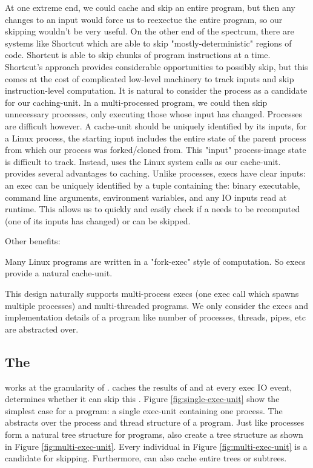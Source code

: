 At one extreme end, we could cache and skip an entire program, but then any changes to an input would force us to reexectue the entire program, so our skipping wouldn't be very useful. On the other end of the spectrum, there are systems like Shortcut \cite{shortcut} which are able to skip "mostly-deterministic" regions of code. Shortcut is able to skip chunks of program instructions at a time. Shortcut's approach provides considerable opportunities to possibly skip, but this comes at the cost of complicated low-level machinery to track inputs and skip instruction-level computation.
It is natural to consider the process as a candidate for our caching-unit. In a multi-processed program, we could then skip unnecessary processes, only executing those whose input has changed. Processes are difficult however. A cache-unit should be uniquely identified by its inputs, for a Linux process, the starting input
  includes the entire state of the parent process from which our process was forked/cloned from. This "input" process-image state is difficult to track. 
Instead, \pc uses the Linux  system calls as our cache-unit.  provides several advantages to caching. Unlike processes, execs have clear inputs: an exec can
be uniquely identified by a tuple containing the: binary executable, command line arguments, environment variables, and any IO inputs read at runtime. This allows us to quickly and easily check if a \cacheunit{} needs
to be recomputed (one of its inputs has changed) or can be skipped.

Other benefits:
\begin{compactitem}
  
  \item Many Linux programs are written in a "fork-exec" style of computation. So execs provide a natural
  cache-unit.
  \item This design naturally supports multi-process execs (one exec call which spawns multiple processes) and multi-threaded programs. We only consider the execs and implementation details of a program like number of processes, threads, pipes, etc are abstracted over.
\end{compactitem}

\subsection{The \cacheunit}
\pc works at the granularity of \cacheunit. \pc caches the results of \cacheunit{} and at every exec
IO event, determines whether it can skip this \cacheunit. Figure \ref{fig:single-exec-unit} show the simplest
case for a program: a single exec-unit containing one process. The \cacheunit{} abstracts over the process and
thread structure of a program. Just like processes form a natural tree structure for programs, \cacheunit{} also
create a tree structure as shown in Figure \ref{fig:multi-exec-unit}. Every individual \cacheunit{} in Figure \ref{fig:multi-exec-unit} is a candidate for skipping. Furthermore, \pc can also cache entire \cacheunit
trees or subtrees.

